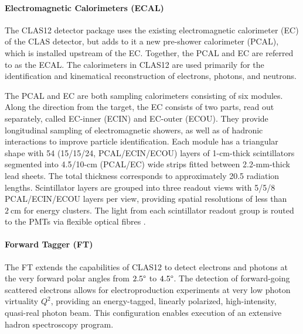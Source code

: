 \paragraph{Electromagnetic Calorimeters (ECAL)}
    The CLAS12 detector package uses the existing electromagnetic calorimeter (EC) of the CLAS detector, but adds to it a new pre-shower calorimeter (PCAL), which is installed upstream of the EC.
    Together, the PCAL and EC are referred to as the ECAL.
    The calorimeters in CLAS12 are used primarily for the identification and kinematical reconstruction of electrons, photons, and neutrons.

    The PCAL and EC are both sampling calorimeters consisting of six modules.
    Along the direction from the target, the EC consists of two parts, read out separately, called EC-inner (ECIN) and EC-outer (ECOU).
    They provide longitudinal sampling of electromagnetic showers, as well as of hadronic interactions to improve particle identification.
    Each module has a triangular shape with 54 (15/15/24, PCAL/ECIN/ECOU) layers of 1-cm-thick scintillators segmented into 4.5/10-cm (PCAL/EC) wide strips fitted between 2.2-mm-thick lead sheets.
    The total thickness corresponds to approximately 20.5 radiation lengths.
    Scintillator layers are grouped into three readout views with 5/5/8 PCAL/ECIN/ECOU layers per view, providing spatial resolutions of less than $2 ~\text{cm}$ for energy clusters.
    The light from each scintillator readout group is routed to the PMTs via flexible optical fibres \cite{asryan2020}.

\paragraph{Forward Tagger (FT)}
    The FT extends the capabilities of CLAS12 to detect electrons and photons at the very forward polar angles from $2.5\degree$ to $4.5\degree$.
    The detection of forward-going scattered electrons allows for electroproduction experiments at very low photon virtuality $Q^2$, providing an energy-tagged, linearly polarized, high-intensity, quasi-real photon beam.
    This configuration enables execution of an extensive hadron spectroscopy program.

